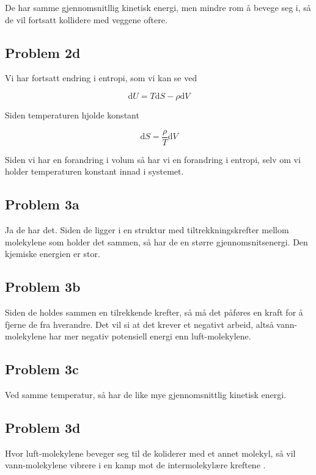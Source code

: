 \documentclass[ reprint, amsmath,amssymb, aps]{revtex4-2}
\begin{document}
De har samme gjennomsnitllig kinetisk energi, men mindre rom å bevege seg i, så de vil fortsatt kollidere med veggene oftere.

\subsection*{Problem 2d}

Vi har fortsatt endring i entropi, som vi kan se ved

$$\mathrm{d}U = T\mathrm{d}S - \rho \mathrm{d}V$$

Siden temperaturen hjolde konstant

$$\mathrm{d}S = \frac{\rho}{T}\mathrm{d}V$$

Siden vi har en forandring i volum så har vi en forandring i entropi, selv om vi holder temperaturen konstant innad i systemet.

\subsection*{Problem 3a}

Ja de har det. Siden de ligger i en struktur med tiltrekkningskrefter mellom molekylene som holder det sammen, så har de en større gjennomsnitsenergi. Den kjemiske energien er stor.

\subsection*{Problem 3b}

Siden de holdes sammen en tilrekkende krefter, så må det påføres en kraft for å fjerne de fra hverandre. Det vil si at det krever et negativt arbeid, altså vann-molekylene har mer negativ potensiell energi enn luft-molekylene. 

\subsection*{Problem 3c}

Ved samme temperatur, så har de like mye gjennomsnittlig kinetisk energi.

\subsection*{Problem 3d}

Hvor luft-molekylene beveger seg til de koliderer med et annet molekyl, så vil vann-molekylene vibrere i en kamp mot de intermolekylære kreftene .
\end{document}
